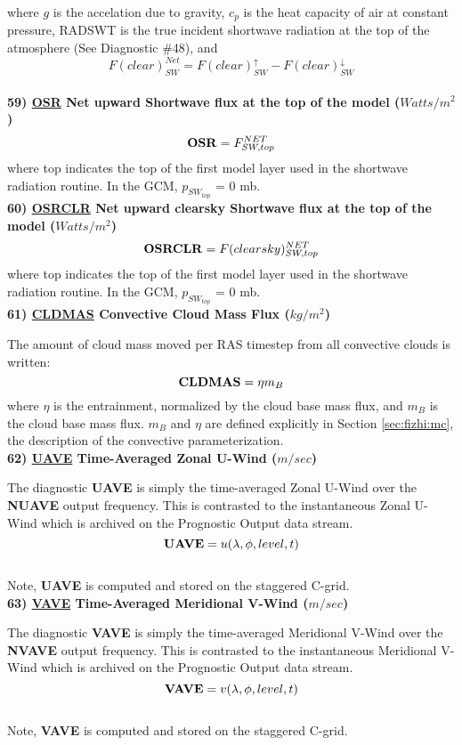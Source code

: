 \noindent
where $g$ is the accelation due to gravity,
$c_p$ is the heat capacity of air at constant pressure, RADSWT is the true incident
shortwave radiation at the top of the atmosphere (See Diagnostic \#48), and
\[
F(clear)_{SW}^{Net} = F(clear)_{SW}^\uparrow - F(clear)_{SW}^\downarrow
\]
\\

\noindent
{\bf 59)  \underline {OSR} Net upward Shortwave flux at the top of the model ($Watts/m^2$) }
\[
{\bf OSR}  =  F_{SW,top}^{NET}
\]                                                                                       
\noindent
where top indicates the top of the first model layer used in the shortwave radiation
routine.
In the GCM, $p_{SW_{top}}$ = 0 mb.
\\

\noindent
{\bf 60)  \underline {OSRCLR} Net upward clearsky Shortwave flux at the top of the model ($Watts/m^2$) }
\[
{\bf OSRCLR}  =  F(clearsky)_{SW,top}^{NET}
\]
\noindent
where top indicates the top of the first model layer used in the shortwave radiation
routine.
In the GCM, $p_{SW_{top}}$ = 0 mb.
\\


\noindent
{\bf 61)  \underline {CLDMAS} Convective Cloud Mass Flux ($kg/m^2$) } 

\noindent
The amount of cloud mass moved per RAS timestep from all convective clouds is written:
\[
{\bf CLDMAS} = \eta m_B
\]
where $\eta$ is the entrainment, normalized by the cloud base mass flux, and $m_B$ is
the cloud base mass flux. $m_B$ and $\eta$ are defined explicitly in Section \ref{sec:fizhi:mc}, the 
description of the convective parameterization.
\\



\noindent
{\bf 62)  \underline {UAVE} Time-Averaged Zonal U-Wind ($m/sec$) }

\noindent
The diagnostic {\bf UAVE} is simply the time-averaged Zonal U-Wind over
the {\bf NUAVE} output frequency.  This is contrasted to the instantaneous
Zonal U-Wind which is archived on the Prognostic Output data stream.
\[
{\bf UAVE} = u(\lambda, \phi, level , t)
\]
\\
Note, {\bf UAVE} is computed and stored on the staggered C-grid.
\\

\noindent
{\bf 63)  \underline {VAVE} Time-Averaged Meridional V-Wind ($m/sec$) }

\noindent
The diagnostic {\bf VAVE} is simply the time-averaged Meridional V-Wind over
the {\bf NVAVE} output frequency.  This is contrasted to the instantaneous
Meridional V-Wind which is archived on the Prognostic Output data stream.
\[
{\bf VAVE} = v(\lambda, \phi, level , t)
\]
\\
Note, {\bf VAVE} is computed and stored on the staggered C-grid.
\\

